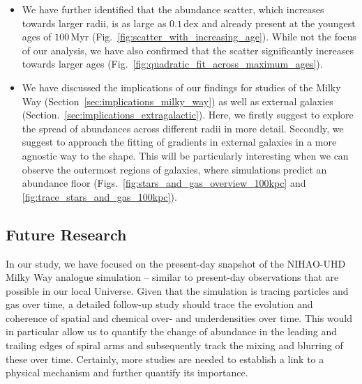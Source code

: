 \documentclass[twocolumn,apj,numberedappendix,appendixfloats,twocolappendix]{openjournal}
\begin{document}
\begin{CJK*}{UTF8}{gbsn}
\begin{itemize}
    \item We have further identified that the abundance scatter, which increases towards larger radii, is as large as $0.1\,\mathrm{dex}$ and already present at the youngest ages of $100\,\mathrm{Myr}$ (Fig.~\ref{fig:scatter_with_increasing_age}). While not the focus of our analysis, we have also confirmed that the scatter significantly increases towards larger ages (Fig.~\ref{fig:quadratic_fit_across_maximum_ages}).
    \item We have discussed the implications of our findings for studies of the Milky Way (Section~\ref{sec:implications_milky_way}) as well as external galaxies (Section.~\ref{sec:implications_extragalactic}). Here, we firstly suggest to explore the spread of abundances across different radii in more detail. Secondly, we suggest to approach the fitting of gradients in external galaxies in a more agnostic way to the shape. This will be particularly interesting when we can observe the outermost regions of galaxies, where simulations predict an abundance floor (Figs.~\ref{fig:stars_and_gas_overview_100kpc} and \ref{fig:trace_stars_and_gas_100kpc}).
\end{itemize}

\subsection{Future Research} \label{sec:future_research}

In our study, we have focused on the present-day snapshot of the NIHAO-UHD Milky Way analogue simulation -- similar to present-day observations that are possible in our local Universe. Given that the simulation is tracing particles and gas over time, a detailed follow-up study should trace the evolution and coherence of spatial and chemical over- and underdensities over time. This would in particular allow us to quantify the change of abundance in the leading and trailing edges of spiral arms and subsequently track the mixing and blurring of these over time. Certainly, more studies are needed to establish a link to a physical mechanism and further quantify its importance.


\end{CJK*}
\end{document}

